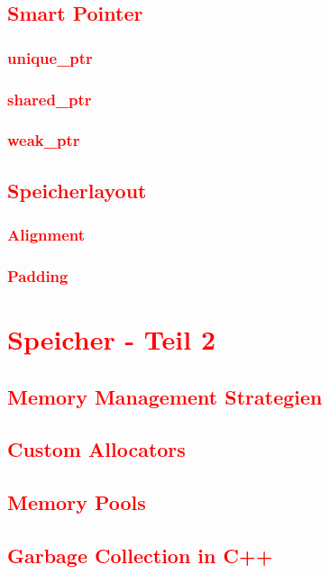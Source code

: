\section{\textcolor{red}{Smart Pointer}}\label{sec:smart-pointers}
\subsection{\textcolor{red}{unique\_ptr}}\label{sec:unique-ptr}
\subsection{\textcolor{red}{shared\_ptr}}\label{sec:shared-ptr}
\subsection{\textcolor{red}{weak\_ptr}}\label{sec:weak-ptr}
\section{\textcolor{red}{Speicherlayout}}\label{sec:memory-layout}
\subsection{\textcolor{red}{Alignment}}\label{sec:alignment}
\subsection{\textcolor{red}{Padding}}\label{sec:padding}

\cleardoublepage\chapter{\textcolor{red}{Speicher - Teil 2}}\label{chap:memory-2}
\section{\textcolor{red}{Memory Management Strategien}}\label{sec:memory-management-strategies}
\section{\textcolor{red}{Custom Allocators}}\label{sec:custom-allocators}
\section{\textcolor{red}{Memory Pools}}\label{sec:memory-pools}
\section{\textcolor{red}{Garbage Collection in C++}}\label{sec:garbage-collection}
